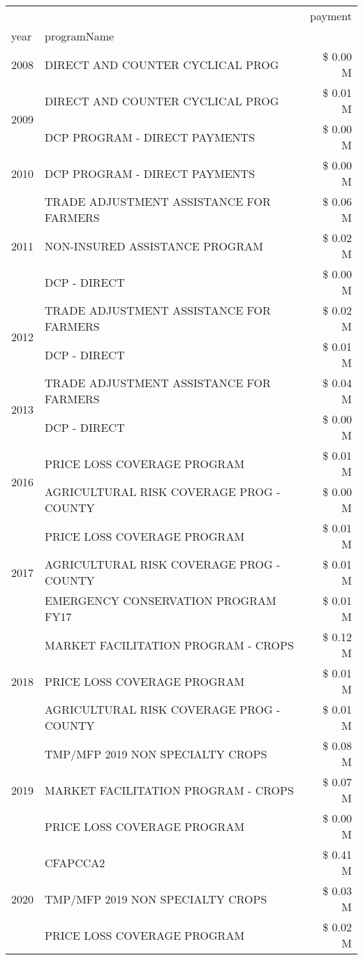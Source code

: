\begin{tabular}{llr}
\toprule
 &  & payment \\
year & programName &  \\
\midrule
2008 & DIRECT AND COUNTER CYCLICAL PROG & \$ 0.00 M \\
\cline{1-3}
\multirow[t]{2}{*}{2009} & DIRECT AND COUNTER CYCLICAL PROG & \$ 0.01 M \\
 & DCP PROGRAM - DIRECT PAYMENTS & \$ 0.00 M \\
\cline{1-3}
2010 & DCP PROGRAM - DIRECT PAYMENTS & \$ 0.00 M \\
\cline{1-3}
\multirow[t]{3}{*}{2011} & TRADE ADJUSTMENT ASSISTANCE FOR FARMERS & \$ 0.06 M \\
 & NON-INSURED ASSISTANCE PROGRAM & \$ 0.02 M \\
 & DCP - DIRECT & \$ 0.00 M \\
\cline{1-3}
\multirow[t]{2}{*}{2012} & TRADE ADJUSTMENT ASSISTANCE FOR FARMERS & \$ 0.02 M \\
 & DCP - DIRECT & \$ 0.01 M \\
\cline{1-3}
\multirow[t]{2}{*}{2013} & TRADE ADJUSTMENT ASSISTANCE FOR FARMERS & \$ 0.04 M \\
 & DCP - DIRECT & \$ 0.00 M \\
\cline{1-3}
\multirow[t]{2}{*}{2016} & PRICE LOSS COVERAGE PROGRAM & \$ 0.01 M \\
 & AGRICULTURAL RISK COVERAGE PROG - COUNTY & \$ 0.00 M \\
\cline{1-3}
\multirow[t]{3}{*}{2017} & PRICE LOSS COVERAGE PROGRAM & \$ 0.01 M \\
 & AGRICULTURAL RISK COVERAGE PROG - COUNTY & \$ 0.01 M \\
 & EMERGENCY CONSERVATION PROGRAM FY17 & \$ 0.01 M \\
\cline{1-3}
\multirow[t]{3}{*}{2018} & MARKET FACILITATION PROGRAM - CROPS & \$ 0.12 M \\
 & PRICE LOSS COVERAGE PROGRAM & \$ 0.01 M \\
 & AGRICULTURAL RISK COVERAGE PROG - COUNTY & \$ 0.01 M \\
\cline{1-3}
\multirow[t]{3}{*}{2019} & TMP/MFP 2019 NON SPECIALTY CROPS & \$ 0.08 M \\
 & MARKET FACILITATION PROGRAM - CROPS & \$ 0.07 M \\
 & PRICE LOSS COVERAGE PROGRAM & \$ 0.00 M \\
\cline{1-3}
\multirow[t]{3}{*}{2020} & CFAPCCA2 & \$ 0.41 M \\
 & TMP/MFP 2019 NON SPECIALTY CROPS & \$ 0.03 M \\
 & PRICE LOSS COVERAGE PROGRAM & \$ 0.02 M \\
\cline{1-3}
\bottomrule
\end{tabular}
